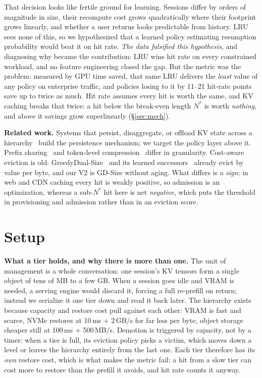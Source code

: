 \documentclass{article}
\begin{document}
That decision looks like fertile ground for learning. Sessions differ by orders of magnitude in size, their recompute cost grows quadratically where their footprint grows linearly, and whether a user returns looks predictable from history. LRU sees none of this, so we hypothesized that a learned policy estimating resumption probability would beat it on hit rate. \emph{The data falsified this hypothesis}, and diagnosing why became the contribution: LRU wins hit rate on every constrained workload, and no feature engineering closed the gap. But the metric was the problem: measured by GPU time saved, that same LRU delivers the \emph{least} value of any policy on enterprise traffic, and policies losing to it by 11--21 hit-rate points save up to twice as much. Hit rate assumes every hit is worth the same, and KV caching breaks that twice: a hit below the break-even length $N^{*}$ is worth \emph{nothing}, and above it savings grow superlinearly (\S\ref{sec:mech}).

\textbf{Related work.} Systems that persist, disaggregate, or offload KV state across a hierarchy~\cite{kwon2023pagedattention,gao2024cachedattention,qin2025mooncake,sheng2023flexgen} build the persistence mechanism; we target the policy layer above it. Prefix sharing~\cite{gim2024promptcache,zhong2024lmcache,yao2024cacheblend} and token-level compression~\cite{zhang2023h2o,liu2023scissorhands,lee2024infinigen,liu2024cachegen} differ in granularity. Cost-aware eviction is old: GreedyDual-Size~\cite{cao1997greedydualsize} and its learned successors~\cite{song2020lrb,beckmann2018lhd} already evict by value per byte, and our V2 is GD-Size without aging. What differs is a \emph{sign}: in web and CDN caching every hit is weakly positive, so admission is an optimization, whereas a sub-$N^{*}$ hit here is net \emph{negative}, which puts the threshold in provisioning and admission rather than in an eviction score.

\section{Setup}
\label{sec:setup}

\textbf{What a tier holds, and why there is more than one.} The unit of management is a whole conversation: one session's KV tensors form a single object of tens of MB to a few GB. When a session goes idle and VRAM is needed, a serving engine would discard it, forcing a full re-prefill on return; instead we serialize it one tier down and read it back later. The hierarchy exists because capacity and restore cost pull against each other: VRAM is fast and scarce, NVMe restores at 10\,ms + 2\,GB/s for far less per byte, object storage cheaper still at 100\,ms + 500\,MB/s. Demotion is triggered by capacity, not by a timer: when a tier is full, its eviction policy picks a victim, which moves down a level or leaves the hierarchy entirely from the last one. Each tier therefore has its \emph{own} restore cost, which is what makes the metric fail: a hit from a slow tier can cost more to restore than the prefill it avoids, and hit rate counts it anyway.
\end{document}
